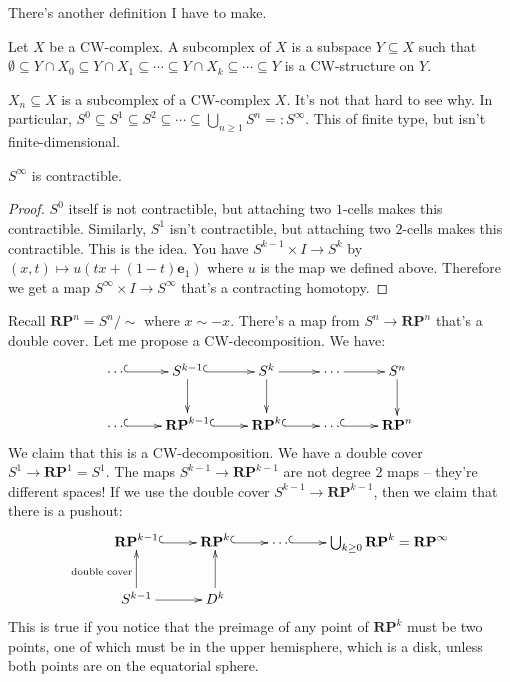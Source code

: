 There's another definition I have to make.
\begin{definition}
Let $X$ be a CW-complex. A subcomplex of $X$ is a subspace $Y\subseteq X$ such that $\emptyset\subseteq Y\cap X_0\subseteq Y\cap X_1\subseteq\cdots\subseteq Y\cap X_k\subseteq \cdots\subseteq Y$ is a CW-structure on $Y$.
\end{definition}
\begin{example}
$X_n\subseteq X$ is a subcomplex of a CW-complex $X$. It's not that hard to see why. In particular, $S^0\subseteq S^1\subseteq S^2\subseteq\cdots\subseteq \bigcup_{n\geq 1}S^n=:S^\infty$. This of finite type, but isn't finite-dimensional.
\end{example}
\begin{lemma}
$S^\infty$ is contractible.
\end{lemma}
\begin{proof}
$S^0$ itself is not contractible, but attaching two $1$-cells makes this contractible. Similarly, $S^1$ isn't contractible, but attaching two $2$-cells makes this contractible. This is the idea. You have $S^{k-1}\times I\to S^k$ by $(x,t)\mapsto u(tx+(1-t)\mathbf{e}_1)$ where $u$ is the map we defined above. Therefore we get a map $S^\infty\times I\to S^\infty$ that's a contracting homotopy.
\end{proof}
\begin{example}
Recall $\mathbf{RP}^n=S^n/\sim$ where $x\sim -x$. There's a map from $S^n\to\mathbf{RP}^n$ that's a double cover. Let me propose a CW-decomposition. We have:
\begin{equation*}
\xymatrix{\cdots\ar@{^(->}[r] & S^{k-1}\ar@{^(->}[r]\ar[d] & S^k\ar[d]\ar[r] & \cdots\ar[r] & S^n\ar[d]\\
\cdots\ar@{^(->}[r] & \mathbf{RP}^{k-1}\ar@{^(->}[r] & \mathbf{RP}^k\ar@{^(->}[r] & \cdots\ar@{^(->}[r] & \mathbf{RP}^n}
\end{equation*}
We claim that this is a CW-decomposition. We have a double cover $S^1\to\mathbf{RP}^1=S^1$. The maps $S^{k-1}\to\mathbf{RP}^{k-1}$ are not degree $2$ maps -- they're different spaces! If we use the double cover $S^{k-1}\to\mathbf{RP}^{k-1}$, then we claim that there is a pushout:
\begin{equation*}
\xymatrix{\mathbf{RP}^{k-1}\ar@{^(->}[r]& \mathbf{RP}^k\ar@{^(->}[r] & \cdots\ar@{^(->}[r] & \bigcup_{k\geq 0}\mathbf{RP}^k=\mathbf{RP}^\infty\\
S^{k-1}\ar[u]^{\text{double cover}}\ar[r] & D^k\ar[u]}
\end{equation*}
This is true if you notice that the preimage of any point of $\mathbf{RP}^k$ must be two points, one of which must be in the upper hemisphere, which is a disk, unless both points are on the equatorial sphere.
\end{example}
